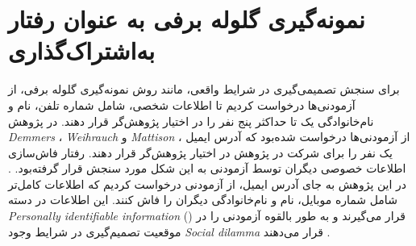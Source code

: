 \section{نمونه‌گیری گلوله برفی به عنوان رفتار به‌اشتراک‌گذاری}
برای سنجش تصمیمی‌گیری در شرایط واقعی، مانند روش نمونه‌گیری گلوله برفی، از آزمودنی‌ها درخواست 
کردیم تا اطلاعات شخصی، شامل شماره تلفن، نام و نام‌خانوادگی یک تا حداکثر پنج نفر را در اختیار پژوهش‌گر قرار دهند.
در پژوهش 
\textit{
	\gls{Demmers}
}،
\textit{
	\gls{Weihrauch}
} و 
\textit{
	\gls{Mattison}
}،
از آزمودنی‌ها درخواست شده‌بود که آدرس ایمیل یک نفر را برای شرکت در پژوهش 
در اختیار پژوهش‌گر قرار دهند. رفتار فاش‌سازی اطلاعات خصوصی دیگران توسط آزمودنی به این شکل مورد سنجش  قرار گرفته‌بود.
\citep{demmersYourDataNot2021}.
در این پژوهش به جای آدرس ایمیل، از آزمودنی درخواست کردیم که اطلاعات کامل‌تر شامل شماره موبایل، نام و نام‌خانوادگی دیگران 
را فاش کنند. این اطلاعات در دسته 
\textit{
	\gls{Personally identifiable information}
}()\citep{mccallisterGuideProtectingConfidentiality2010a}
قرار می‌گیرند و به طور بالقوه آزمودنی را در موقعیت  تصمیم‌گیری در شرایط وجود
\textit{
	\gls{Social dilamma}
}
قرار می‌دهند
\citep{sanfilippoGoverningPrivacyKnowledge2021,madisonChallengeCitiesGoverning2022,dongBirdsFeatherFlock2021}.